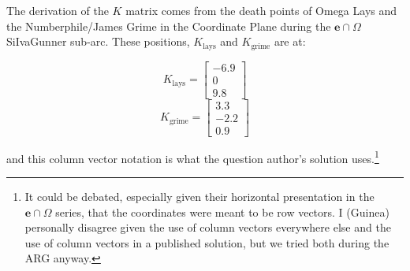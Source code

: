 \documentclass{article}
\begin{document}
The derivation of the $K$ matrix comes from the death points of Omega Lays and the Numberphile/James Grime in the Coordinate Plane during the \href{https://siivagunner.fandom.com/wiki/E%E2%88%A9%CE%A9}{$\mathbf{e} \cap \Omega$} SiIvaGunner sub-arc. These positions, $K_\text{lays}$ and $K_\text{grime}$ are at:

\[ K_\text{lays} = \begin{bmatrix} -6.9\\0\\9.8\end{bmatrix} \]
\[ K_\text{grime} = \begin{bmatrix} 3.3\\-2.2\\0.9\end{bmatrix} \]

and this column vector notation is what the question author's solution uses.\footnote{It could be debated, especially given their horizontal presentation in the $\mathbf{e} \cap \Omega$ series, that the coordinates were meant to be row vectors. I (Guinea) personally disagree given the use of column vectors everywhere else and the use of column vectors in a published solution, but we tried both during the ARG anyway.}
\end{document}
